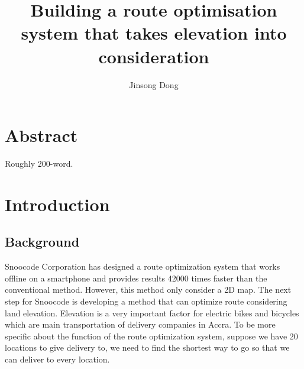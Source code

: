 \documentclass[final-report]{report-template}
\title{Building a route optimisation system that takes elevation into consideration}
\author{Jinsong Dong}
\begin{document}
\maketitlepage  %

\section* {Abstract}
Roughly 200-word.

\section {Introduction}
\subsection {Background}
Snoocode Corporation has designed a route optimization system that works offline on a smartphone and provides 
results 42000 times faster than the conventional method. However, this method only consider a 2D map.
The next step for Snoocode is developing a method that can optimize route considering land elevation. 
Elevation is a very important factor for electric bikes and bicycles which are main transportation of delivery companies in Accra.
To be more specific about the function of the route optimization system, suppose we have 20 locations to
give delivery to, we need to find the shortest way to go so that we can deliver to every location. 
\end{document}
